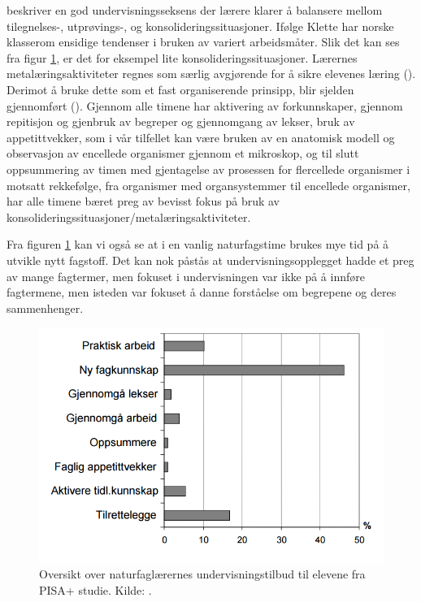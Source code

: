 \documentclass[main.tex]{subfiles}
\begin{document}
 beskriver en god undervisningsseksens der lærere klarer å balansere mellom tilegnelses-,
utprøvings-, og konsolideringssituasjoner. Ifølge Klette har norske klasserom ensidige tendenser i bruken av 
variert arbeidsmåter. Slik det kan ses fra figur \ref{fig:odeg10}, er det for eksempel lite konsolideringssituasjoner.
Lærernes metalæringsaktiviteter regnes som særlig avgjørende for å sikre elevenes læring (). Derimot å bruke dette som et fast
organiserende prinsipp, blir sjelden gjennomført ().
Gjennom alle timene har aktivering av forkunnskaper, gjennom repitisjon og gjenbruk av begreper og gjennomgang av 
lekser, bruk av appetittvekker, som i vår tilfellet kan være bruken av en anatomisk modell og observasjon av
encellede organismer gjennom et mikroskop, og til slutt oppsummering av timen med gjentagelse av prosessen
for flercellede organismer i motsatt rekkefølge, fra organismer med organsystemmer til encellede organismer, har 
alle timene bæret preg av bevisst fokus på bruk av konsolideringssituasjoner/metalæringsaktiviteter. 


Fra figuren \ref{fig:odeg10} kan vi også se at i en vanlig naturfagstime brukes mye tid på å utvikle nytt fagstoff.
Det kan nok påstås at undervisningsopplegget hadde et preg av mange fagtermer, men fokuset i undervisningen var ikke
på å innføre fagtermene, men isteden var fokuset å danne forståelse om begrepene og deres sammenhenger. 

\begin{figure}[h!]
\includegraphics[scale = 0.6]{../figures/undervisnings_aktivitet.png}
\caption{Oversikt over naturfaglærernes undervisningstilbud til elevene fra PISA+ studie. Kilde: \protect{}.}
\label{fig:odeg10}
\end{figure}
\end{document}
